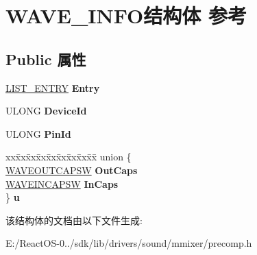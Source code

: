 \hypertarget{struct_w_a_v_e___i_n_f_o}{}\section{W\+A\+V\+E\+\_\+\+I\+N\+F\+O结构体 参考}
\label{struct_w_a_v_e___i_n_f_o}
\subsection*{Public 属性}
\begin{DoxyCompactItemize}
\item 
\mbox{\label{struct_w_a_v_e___i_n_f_o_a38f8ef2efc926b968414f41274c12927}} 
\hyperlink{struct___l_i_s_t___e_n_t_r_y}{L\+I\+S\+T\+\_\+\+E\+N\+T\+RY} {\bfseries Entry}
\item 
\mbox{\label{struct_w_a_v_e___i_n_f_o_a5cfd69c4721bbb5aea87ff68d49a4a69}} 
U\+L\+O\+NG {\bfseries Device\+Id}
\item 
\mbox{\label{struct_w_a_v_e___i_n_f_o_a6d6e0c5285c19ca535f62817b203567b}} 
U\+L\+O\+NG {\bfseries Pin\+Id}
\item 
\mbox{\label{struct_w_a_v_e___i_n_f_o_a984d6dba106e8bd1fb9b6104a3945438}} 
\begin{tabbing}
xx\=xx\=xx\=xx\=xx\=xx\=xx\=xx\=xx\=\kill
union \{\\
\>\hyperlink{structtag_w_a_v_e_o_u_t_c_a_p_s_w}{WAVEOUTCAPSW} {\bfseries OutCaps}\\
\>\hyperlink{structtag_w_a_v_e_i_n_c_a_p_s_w}{WAVEINCAPSW} {\bfseries InCaps}\\
\} {\bfseries u}\\

\end{tabbing}\end{DoxyCompactItemize}


该结构体的文档由以下文件生成\+:\begin{DoxyCompactItemize}
\item 
E\+:/\+React\+O\+S-\/0../sdk/lib/drivers/sound/mmixer/precomp.\+h\end{DoxyCompactItemize}
